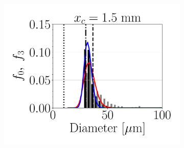 \begin{figure}[ht]
\flushleft
%
\begin{subfigure}[b]{1.1\textwidth}
	\flushleft
   \includegraphics[scale=0.28]{./part3_applications/figures_ch8_resolved/SPRAY_characterization/histograms_size_volume/DX10_xD05p00_histograms}
   \hspace*{-0.15in}

\end{subfigure}
\end{figure}

